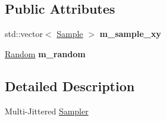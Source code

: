 \subsection*{\-Public \-Attributes}
\begin{DoxyCompactItemize}
\item 
\hypertarget{structnih_1_1_m_j_sampler_a4de5d0a6e69b37828028501e16dbb143}{
std\-::vector$<$ \hyperlink{structnih_1_1_m_j_sampler_1_1_sample}{\-Sample} $>$ {\bfseries m\-\_\-sample\-\_\-xy}}
\label{structnih_1_1_m_j_sampler_a4de5d0a6e69b37828028501e16dbb143}

\item 
\hypertarget{structnih_1_1_m_j_sampler_a5280690591be240bb61c6cbb2db4fbcf}{
\hyperlink{classnih_1_1_random}{\-Random} {\bfseries m\-\_\-random}}
\label{structnih_1_1_m_j_sampler_a5280690591be240bb61c6cbb2db4fbcf}

\end{DoxyCompactItemize}


\subsection{\-Detailed \-Description}
\-Multi-\/\-Jittered \hyperlink{structnih_1_1_sampler}{\-Sampler} 

